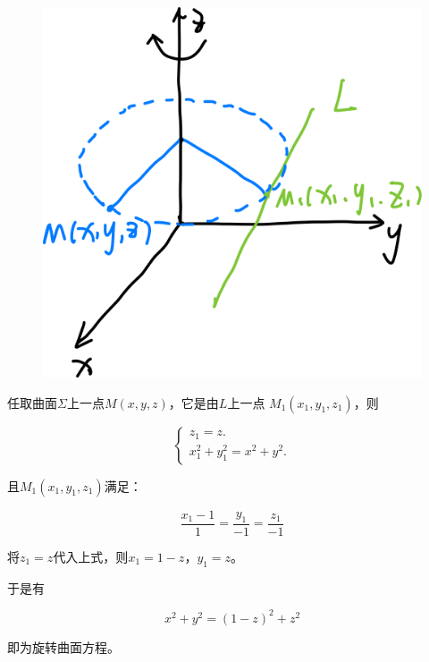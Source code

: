 \documentclass[
	11pt, %
	a4paper, %
]{WhuSakuraBook}
\begin{document}
    \begin{figure}
        \centering
        \includegraphics[scale=0.1]{"Chapter 08 images/pic21.png"}
        \label{pic21}
    \end{figure}

    任取曲面\(\Sigma\)上一点\(M\left(x,y,z\right)\)，它是由\(L\)上一点
    \(M_{1}\left(x_1,y_1,z_1\right)\)，则

    $$
        \left\{\begin{array}{l}
        z_1=z . \\
        x_1^2+y_1^2=x^2+y^2 .
        \end{array}\right.
    $$

    且\(M_{1}\left(x_1,y_1,z_1\right)\)满足：

    $$
        \frac{x_1-1}{1}=\frac{y_1}{-1}=\frac{z_1}{-1}
    $$

    将\(z_1 = z\)代入上式，则\(x_1 = 1 - z\)，\(y_1 = z\)。

    于是有

    $$
        x^2+y^2=(1-z)^2+z^2
    $$

    即为旋转曲面方程。

\end{document}
